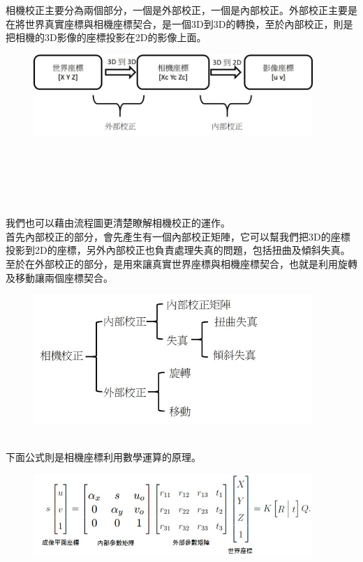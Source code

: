 \documentclass{article}
\begin{document}
相機校正主要分為兩個部分，一個是外部校正，一個是內部校正。外部校正主要是在將世界真實座標與相機座標契合，是一個3D到3D的轉換，至於內部校正，則是把相機的3D影像的座標投影在2D的影像上面。
\\
\begin{figure}[htp]
    \begin{center}
        \includegraphics[width=300pt]{pic/圖片3.jpg}
    \end{center}
\end{figure}
\\\\\\\\\\我們也可以藉由流程圖更清楚瞭解相機校正的運作。
\\首先內部校正的部分，會先產生有一個內部校正矩陣，它可以幫我們把3D的座標投影到2D的座標，另外內部校正也負責處理失真的問題，包括扭曲及傾斜失真。
\\至於在外部校正的部分，是用來讓真實世界座標與相機座標契合，也就是利用旋轉及移動讓兩個座標契合。
\\
\begin{figure}[htp]
    \begin{center}
        \includegraphics[width=300pt]{pic/圖片4.jpg}
    \end{center}
\end{figure}
\\
下面公式則是相機座標利用數學運算的原理。
\\
\begin{figure}[htp]
    \begin{center}
        \includegraphics[width=300pt]{pic/圖片5.jpg}
    \end{center}
\end{figure}
\end{document}
